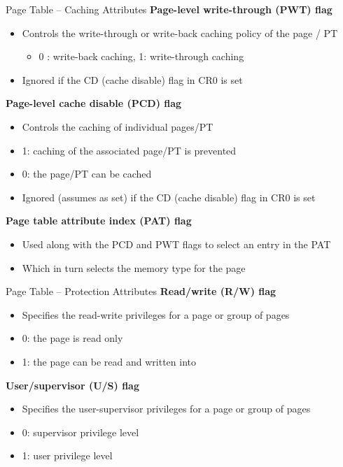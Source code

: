 \documentclass[aspectratio=169,12pt]{beamer}
\begin{document}
\begin{frame}{Page Table – Caching Attributes}
\textbf{Page-level write-through (PWT) flag}
\begin{itemize}
\item Controls the write-through or write-back caching policy of the page / PT
    \begin{itemize}
    \item 0 : write-back caching, 1: write-through caching
    \end{itemize}
\item Ignored if the CD (cache disable) flag in CR0 is set
\end{itemize}

\textbf{Page-level cache disable (PCD) flag}
\begin{itemize}
\item Controls the caching of individual pages/PT
\item 1: caching of the associated page/PT is prevented
\item 0: the page/PT can be cached
\item Ignored (assumes as set) if the CD (cache disable) flag in CR0 is set
\end{itemize}

\textbf{Page table attribute index (PAT) flag}
\begin{itemize}
\item Used along with the PCD and PWT flags to select an entry in the PAT
\item Which in turn selects the memory type for the page
\end{itemize}
\end{frame}

\begin{frame}{Page Table – Protection Attributes}
\textbf{Read/write (R/W) flag}
\begin{itemize}
\item Specifies the read-write privileges for a page or group of pages
\item 0: the page is read only
\item 1: the page can be read and written into
\end{itemize}

\textbf{User/supervisor (U/S) flag}
\begin{itemize}
\item Specifies the user-supervisor privileges for a page or group of pages
\item 0: supervisor privilege level
\item 1: user privilege level
\end{itemize}
\end{frame}
\end{document}
